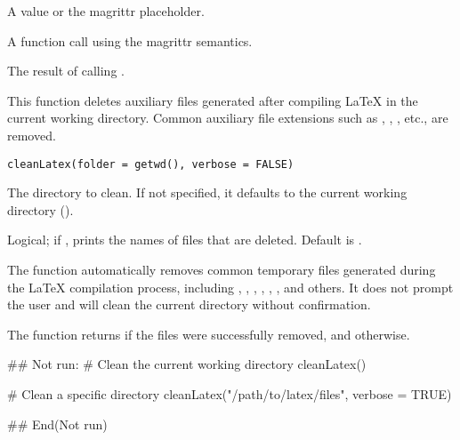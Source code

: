 \documentclass[a4paper]{book}
\begin{document}
%
\begin{Arguments}
\begin{ldescription}
\item[\code{lhs}] A value or the magrittr placeholder.

\item[\code{rhs}] A function call using the magrittr semantics.
\end{ldescription}
\end{Arguments}
%
\begin{Value}
The result of calling .
\end{Value}
%
\begin{Description}
This function deletes auxiliary files generated after compiling LaTeX in the current working directory.
Common auxiliary file extensions such as , , , etc., are removed.
\end{Description}
%
\begin{Usage}
\begin{verbatim}
cleanLatex(folder = getwd(), verbose = FALSE)
\end{verbatim}
\end{Usage}
%
\begin{Arguments}
\begin{ldescription}
\item[\code{folder}] The directory to clean. If not specified, it defaults to the current working directory ().

\item[\code{verbose}] Logical; if , prints the names of files that are deleted. Default is .
\end{ldescription}
\end{Arguments}
%
\begin{Details}
The function automatically removes common temporary files generated during the LaTeX compilation process,
including , , , , , , and others. It does not prompt the user and will
clean the current directory without confirmation.
\end{Details}
%
\begin{Value}
The function returns  if the files were successfully removed, and  otherwise.
\end{Value}
%
\begin{Examples}
\begin{ExampleCode}
## Not run: 
# Clean the current working directory
cleanLatex()

# Clean a specific directory
cleanLatex("/path/to/latex/files", verbose = TRUE)

## End(Not run)
\end{ExampleCode}
\end{Examples}
\end{document}
